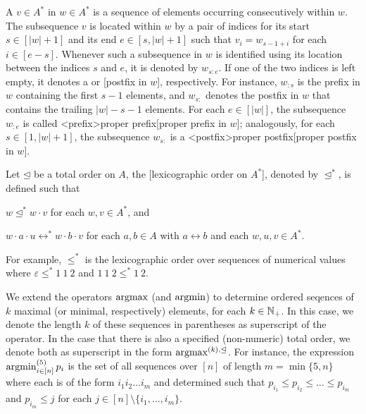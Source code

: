\documentclass[../document.tex]{subfiles}
\begin{document}
    A  \(v \in A^*\) in \(w\in A^*\) is a sequence of elements occurring consecutively within \(w\).
    The subsequence \(v\) is located within \(w\) by a pair of indices for its start \(s \in [|w|+1]\) and its end \(e \in [s, |w|+1]\) such that \(v_i = w_{s-1+i}\) for each \(i \in [e-s]\).
    Whenever such a subsequence in \(w\) is identified using its location between the indices \(s\) and \(e\), it is denoted by \(w_{s:e}\).
    If one of the two indices is left empty, it denotes a  or [postfix in \(w\)], respectively.
    For instance, \(w_{:s}\) is the prefix in \(w\) containing the first \(s-1\) elements, and \(w_{s:}\) denotes the postfix in \(w\) that contains the trailing \(|w|-s-1\) elements.
    For each \(e \in [|w|]\), the subsequence \(w_{:e}\) is called <prefix>{proper prefix}[proper prefix in \(w\)]; analogously, for each \(s\in [1,|w|+1]\), the subsequence \(w_{s:}\) is a <postfix>{proper postfix}[proper postfix in \(w\)].

    Let \(\unlhd\) be a total order on \(A\), the [lexicographic order on \(A^*\)], denoted by \(\unlhd^*\), is defined such that
    \begin{inparaenum}
        \item \(w \unlhd^* w \cdot v\) for each \(w, v \in A^*\), and
        \item \(w\cdot a\cdot u \rel^* w\cdot b\cdot v \) for each \(a,b \in A\) with \(a \rel b\) and each \(w,u,v \in A^*\).
    \end{inparaenum}
    For example, \(\leq^*\) is the lexicographic order over sequences of numerical values where \(\varepsilon \leq^* 1\:1\:2\) and \(1\:1\:2\leq^*1\:2\).
    
    We extend the operators \(\operatorname{arg max}\) (and \(\operatorname{arg min}\)) to determine ordered seqences of \(k\) maximal (or minimal, respectively) elements, for each \(k \in \mathbb{N}_+\).
    In this case, we denote the length \(k\) of these sequences in parentheses as superscript of the operator.
    In the case that there is also a specified (non-numeric) total order, we denote both as superscript in the form \(\operatorname{arg max}^{(k), \unlhd}\).
    For instance, the expression \(\operatorname{arg min}^{(5)}_{i \in [n]} p_i\) is the set of all sequences over \([n]\) of length \(m = \min \{5, n\}\) where each is of the form \(i_1 i_2 \ldots i_m\) and determined such that \(p_{i_1} \leq p_{i_2} \leq \ldots \leq p_{i_m}\) and \(p_{i_m} \leq j\) for each \(j \in [n]\setminus\{i_1,\ldots,i_m\}\).
\end{document}
